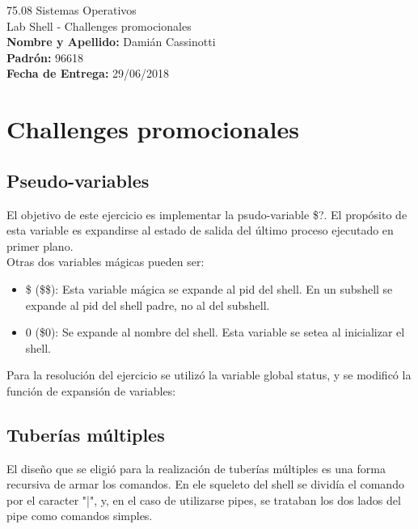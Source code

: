 \documentclass[a4paper, 12pt]{article}
\begin{document}
		
	\begin{titlepage}
		\vspace*{\fill}
		\begin{center}
			\Large 75.08 Sistemas Operativos \\
			\Huge Lab Shell - Challenges promocionales \\
			\bigskip\bigskip\bigskip
			\large\textbf{Nombre y Apellido:} Damián Cassinotti \\
			\textbf{Padrón:} 96618 \\
			\textbf{Fecha de Entrega:} 29/06/2018\\
					
		\end{center}
		\vspace*{\fill}
	\end{titlepage}
	\pagenumbering{arabic}
	\newpage
			
	\tableofcontents
	\newpage
	
	\section{Challenges promocionales}
		\subsection{Pseudo-variables}
		El objetivo de este ejercicio es implementar la psudo-variable \$?. El propósito de esta variable es expandirse al estado de salida del último proceso ejecutado en primer plano.\\
		Otras dos variables mágicas pueden ser:
		\begin{itemize}
			\item \$ (\$\$): Esta variable mágica se expande al pid del shell. En un subshell se expande al pid del shell padre, no al del subshell.
			\item 0 (\$0): Se expande al nombre del shell. Esta variable se setea al inicializar el shell. 
		\end{itemize}
		
		Para la resolución del ejercicio se utilizó la variable global status, y se modificó la función de expansión de variables:\
		
		\bigskip\bigskip
		
		
		\subsection{Tuberías múltiples}
		El diseño que se eligió para la realización de tuberías múltiples es una forma recursiva de armar los comandos. En ele squeleto del shell se dividía el comando por el caracter "|", y, en el caso de utilizarse pipes, se trataban los dos lados del pipe como comandos simples.\\
		
\end{document}
